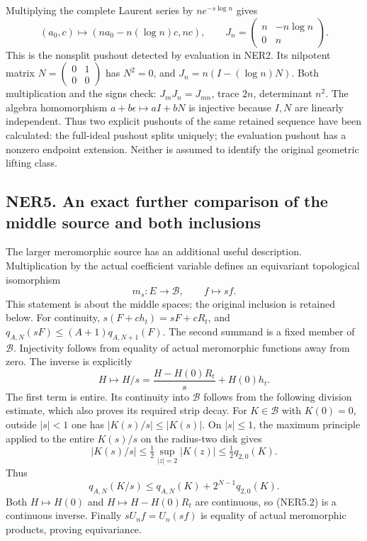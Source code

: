 Multiplying the complete Laurent series by \(n e^{-s\log n}\) gives \[
(a_0,c)\longmapsto(na_0-n(\log n)c,nc),\qquad
J_n=\begin{pmatrix}n&-n\log n\\0&n\end{pmatrix}.
\tag{NER4.3}
\] This is the nonsplit pushout detected by evaluation in NER2. Its
nilpotent matrix
\(N=\left(\begin{smallmatrix}0&1\\0&0\end{smallmatrix}\right)\) has
\(N^2=0\), and \(J_n=n(I-(\log n)N)\). Both multiplication and the signs
check: \(J_mJ_n=J_{mn}\), trace \(2n\), determinant \(n^2\). The algebra
homomorphism \(a+b\epsilon\mapsto aI+bN\) is injective because \(I,N\)
are linearly independent. Thus two explicit pushouts of the same
retained sequence have been calculated: the full-ideal pushout splits
uniquely; the evaluation pushout has a nonzero endpoint extension.
Neither is assumed to identify the original geometric lifting class.

\subsection{NER5. An exact further comparison of the middle source and
both
inclusions}\label{ner5.-an-exact-further-comparison-of-the-middle-source-and-both-inclusions}

The larger meromorphic source has an additional useful description.
Multiplication by the actual coefficient variable defines an equivariant
topological isomorphism \[
\boxed{m_s:E\longrightarrow\mathcal B,\qquad f\longmapsto sf.}
\tag{NER5.1}
\] This statement is about the middle spaces; the original inclusion is
retained below. For continuity, \(s(F+ch_t)=sF+cR_t\), and
\(q_{A,N}(sF)\le(A+1)q_{A,N+1}(F)\). The second summand is a fixed
member of \(\mathcal B\). Injectivity follows from equality of actual
meromorphic functions away from zero. The inverse is explicitly \[
H\longmapsto H/s
=\frac{H-H(0)R_t}{s}+H(0)h_t.
\tag{NER5.2}
\] The first term is entire. Its continuity into \(\mathcal B\) follows
from the following division estimate, which also proves its required
strip decay. For \(K\in\mathcal B\) with \(K(0)=0\), outside \(|s|<1\)
one has \(|K(s)/s|\le|K(s)|\). On \(|s|\le1\), the maximum principle
applied to the entire \(K(s)/s\) on the radius-two disk gives \[
|K(s)/s|\le\tfrac12\sup_{|z|=2}|K(z)|
\le\tfrac12q_{2,0}(K).
\] Thus \[
q_{A,N}(K/s)\le q_{A,N}(K)+2^{N-1}q_{2,0}(K).
\tag{NER5.3}
\] Both \(H\mapsto H(0)\) and \(H\mapsto H-H(0)R_t\) are continuous, so
(NER5.2) is a continuous inverse. Finally \(sU_nf=U_n(sf)\) is equality
of actual meromorphic products, proving equivariance.

